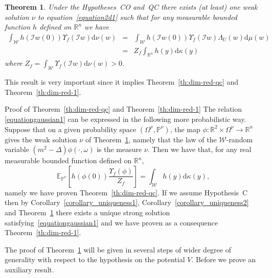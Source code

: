 \documentclass[a4paper,10pt]{article}
\newcommand{\mathd}{\mathrm{d}}
\newenvironment{proof*}[1]{\noindent\textbf{#1\ }}{\hspace*{\fill}$\Box$\medskip}
\newtheorem{theorem}{Theorem}
\begin{document}
\begin{theorem}
  \label{theorem_reduction2}Under the Hypotheses~CO and~QC there exists (at
  least) one weak solution $\nu$ to equation~{\eqref{equation2d1}} such that
  for any measurable bounded function $h$ defined on $\mathbb{R}^n$ we have
  \begin{equation}
    \begin{array}{lll}
      \int_{\mathcal{W}} h (\mathcal{I}w (0)) \Upsilon_f (\mathcal{I}w) \mathd
      \nu (w) & = & \int_{\mathcal{W}} h (\mathcal{I}w (0)) \Upsilon_f
      (\mathcal{I}w) \Lambda_U (w) \mathd \mu (w)\\
      & = & Z_f \int_{\mathbb{R}^n} h (y) \mathd \kappa (y)
      \label{equationgaussian1}
    \end{array}
  \end{equation}
  where $Z_f = \int_{\mathcal{W}} \Upsilon_f (\mathcal{I}w) \mathd \nu (w) >
  0$.
\end{theorem}

This result is very important since it implies Theorem~\ref{th:dim-red-qc} and
Theorem~\ref{th:dim-red-1}.

\begin{proof*}{Proof of Theorem~\ref{th:dim-red-qc} and
Theorem~\ref{th:dim-red-1}}
  The relation {\eqref{equationgaussian1}} can be expressed in the following
  more probabilistic way. Suppose that on a given probability space
  $(\Omega^{\nu}, \mathbb{P}^{\nu})$, the map $\phi : \mathbb{R}^2 \times
  \Omega^{\nu} \rightarrow \mathbb{R}^n$ gives the weak solution $\nu$ of
  Theorem~\ref{theorem_reduction2}, namely that the law of the
  $\mathcal{W}$-random variable $(m^2 - \Delta) \phi (\cdot, \omega)$ is the
  measure $\nu$. Then we have that, for any real measurable bounded function
  defined on $\mathbb{R}^n$,
  \[ \mathbb{E}_{\mathbb{P}^{\nu}} \left[ h (\phi (0)) \frac{\Upsilon_f
     (\phi)}{Z_f} \right] = \int_{\mathcal{W}} h (y) \mathd \kappa (y), \]
  namely we have proven Theorem~\ref{th:dim-red-qc}. If we assume Hypothesis~C
  then by Corollary~\ref{corollary_uniqueness1},
  Corollary~\ref{corollary_uniqueness2} and Theorem~\ref{theorem_reduction2}
  there exists a unique strong solution satisfying~{\eqref{equationgaussian1}}
  and we have proven as a consequence Theorem~\ref{th:dim-red-1}.
\end{proof*}

The proof of Theorem~\ref{theorem_reduction2} will be given in several steps
of wider degree of generality with respect to the hypothesis on the potential
$V$. Before we prove an auxiliary result.
\end{document}
